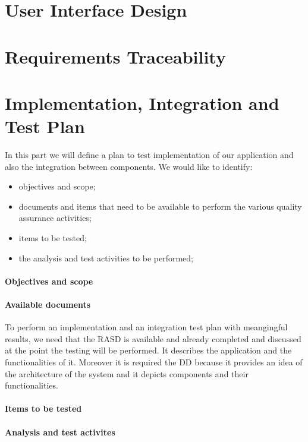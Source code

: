 \documentclass[12pt,titlepage]{article}
\begin{document}
\section{User Interface Design}

\section{Requirements Traceability}

\section{Implementation, Integration and Test Plan}
In this part we will define a plan to test implementation of our application and also the integration between components.
We would like to identify:
\begin{itemize}
\item objectives and scope;
\item documents and items that need to be available to perform the various quality assurance activities;
\item items to be tested;
\item  the analysis and test activities to be performed;
\end{itemize}

\paragraph{Objectives and scope}
\paragraph{Available documents}
To perform an implementation and an integration test plan with meangingful results, we need that the RASD is available and already completed and discussed at the point the testing will be performed. It describes the application and the functionalities of it.
Moreover it is required the DD because it provides an idea of the architecture of the system and it depicts components and their functionalities.
\paragraph{Items to be tested}
\paragraph{Analysis and test activites}
\end{document}
